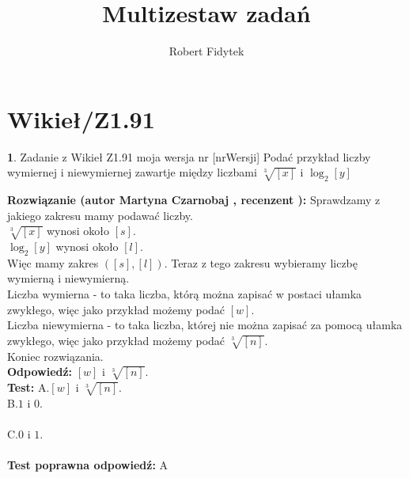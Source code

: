 \documentclass[12pt, a4paper]{article}
\title{Multizestaw zadań}
\author{Robert Fidytek}
\date{}
\theoremstyle{definition} %
\newtheorem{zad}{}
\newcommand{\kategoria}[1]{\section{#1}} %
\newcommand{\zadStart}[1]{\begin{zad}#1\newline} %
\newcommand{\zadStop}{\end{zad}}   %
\newcommand{\rozwStart}[2]{\noindent \textbf{Rozwiązanie (autor #1 , recenzent #2): }\newline} %
\newcommand{\rozwStop}{\newline}                                            %
\newcommand{\odpStart}{\noindent \textbf{Odpowiedź:}\newline}    %
\newcommand{\odpStop}{\newline}                                             %
\newcommand{\testStart}{\noindent \textbf{Test:}\newline} %
\newcommand{\testStop}{\newline} %
\newcommand{\kluczStart}{\noindent \textbf{Test poprawna odpowiedź:}\newline} %
\newcommand{\kluczStop}{\newline} %
\begin{document}
\maketitle


\kategoria{Wikieł/Z1.91}
\zadStart{Zadanie z Wikieł Z1.91 moja wersja nr [nrWersji]}
Podać przykład liczby wymiernej i niewymiernej zawartje między liczbami $\sqrt[3]{[x]}$ i $ \log_{2} [y] $
\zadStop
\rozwStart{Martyna Czarnobaj}{}
Sprawdzamy z jakiego zakresu mamy podawać liczby.\\
$\sqrt[3]{[x]} $ wynosi około $ [s] $.\\
$ \log_{2} [y] $ wynosi około $ [l] $.\\
Więc mamy zakres $ ([s],[l]) $. Teraz z tego zakresu wybieramy liczbę wymierną i niewymierną.\\
Liczba wymierna - to taka liczba, którą można zapisać w postaci ułamka zwykłego, więc jako przykład możemy podać $ [w] $.\\
Liczba niewymierna - to taka liczba, której nie można zapisać za pomocą ułamka zwykłego, więc jako przykład możemy podać $ \sqrt[3]{[n]} $.\\
Koniec rozwiązania.\\
\rozwStop
\odpStart
 $ [w] $ i $ \sqrt[3]{[n]} $.\\
\odpStop
\testStart
A.$ [w] $ i $ \sqrt[3]{[n]} $.\\
B.$ 1 $ i $ 0 $.\\\\
C.$ 0 $ i $ 1 $.\\\\
\testStop
\kluczStart
A
\kluczStop
\end{document}
